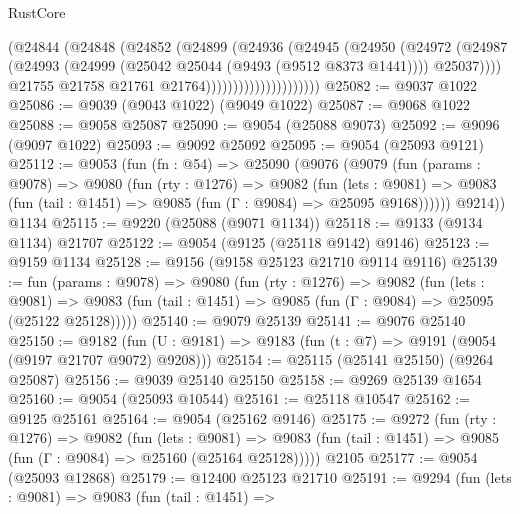 \begin{lexlean}{RustCore}
\begin{coremodule}
                                  (@24844
                                    (@24848
                                      (@24852
                                        (@24899
                                          (@24936
                                            (@24945
                                              (@24950
                                                (@24972
                                                  (@24987
                                                    (@24993
                                                      (@24999
                                                        (@25042 @25044 (@9493 (@9512 @8373 @1441))))
                                                      @25037))))
                                              @21755
                                              @21758
                                              @21761
                                              @21764)))))))))))))))))))))
@25082 := @9037 @1022
@25086 := @9039 (@9043 @1022) (@9049 @1022)
@25087 := @9068 @1022
@25088 := @9058 @25087
@25090 := @9054 (@25088 @9073)
@25092 := @9096 (@9097 @1022)
@25093 := @9092 @25092
@25095 := @9054 (@25093 @9121)
@25112 := @9053
    (fun (fn : @54) =>
    @25090
      (@9076
        (@9079
          (fun (params : @9078) =>
          @9080
            (fun (rty : @1276) =>
            @9082
              (fun (lets : @9081) =>
              @9083 (fun (tail : @1451) => @9085 (fun (Γ : @9084) => @25095 @9168))))))
        @9214))
    @1134
@25115 := @9220 (@25088 (@9071 @1134))
@25118 := @9133 (@9134 @1134) @21707
@25122 := @9054 (@9125 (@25118 @9142) @9146)
@25123 := @9159 @1134
@25128 := @9156 (@9158 @25123 @21710 @9114 @9116)
@25139 := fun (params : @9078) =>
  @9080
    (fun (rty : @1276) =>
    @9082
      (fun (lets : @9081) =>
      @9083 (fun (tail : @1451) => @9085 (fun (Γ : @9084) => @25095 (@25122 @25128)))))
@25140 := @9079 @25139
@25141 := @9076 @25140
@25150 := @9182
    (fun (U : @9181) => @9183 (fun (t : @7) => @9191 (@9054 (@9197 @21707 @9072) @9208)))
@25154 := @25115 (@25141 @25150) (@9264 @25087)
@25156 := @9039 @25140 @25150
@25158 := @9269 @25139 @1654
@25160 := @9054 (@25093 @10544)
@25161 := @25118 @10547
@25162 := @9125 @25161
@25164 := @9054 (@25162 @9146)
@25175 := @9272
    (fun (rty : @1276) =>
    @9082
      (fun (lets : @9081) =>
      @9083 (fun (tail : @1451) => @9085 (fun (Γ : @9084) => @25160 (@25164 @25128)))))
    @2105
@25177 := @9054 (@25093 @12868)
@25179 := @12400 @25123 @21710
@25191 := @9294
    (fun (lets : @9081) =>
    @9083
      (fun (tail : @1451) =>

\end{coremodule}
\end{lexlean}
